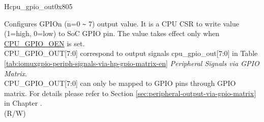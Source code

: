 \begin{register}{H}{cpu\_gpio\_out}{0x805}\label{regdesc:GPIO_OUT}
%
%
%
%
%
%
%
%
%
\regnewline%
\begin{regdesc}\begin{reglist}
\label{fielddesc:GPIO_OUT}\item [CPU\_GPIO\_OUT] Configures GPIOn (n=0 \verb+~+ 7) output value. It is a CPU CSR to write value (1=high, 0=low) to SoC GPIO pin. The value takes effect only when \hyperref[fielddesc:GPIO_OEN]{CPU\_GPIO\_OEN} is set.\\
CPU\_GPIO\_OUT[7:0] correspond to output signals cpu\_gpio\_out[7:0] in Table \ref{tab:iomuxgpio-periph-signals-via-hp-gpio-matrix-en} \textit{Peripheral Signals via GPIO Matrix}. \\
CPU\_GPIO\_OUT[7:0] can only be mapped to GPIO pins through GPIO matrix. For details please refer to Section \ref{sec:peripheral-output-via-gpio-matrix} in Chapter \textit{}.\\
(R/W)
\end{reglist}\end{regdesc}
\end{register}
